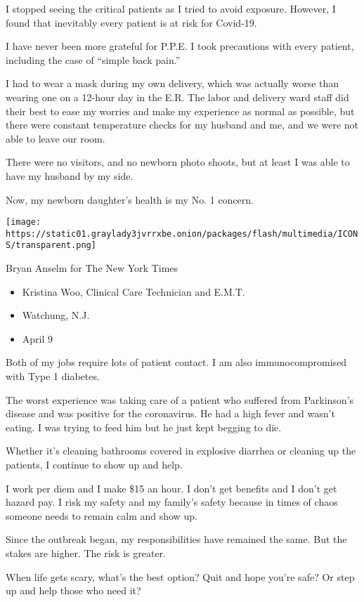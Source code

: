 I stopped seeing the critical patients as I tried to avoid exposure.
However, I found that inevitably every patient is at risk for Covid-19.

I have never been more grateful for P.P.E. I took precautions with every
patient, including the case of ``simple back pain.''

I had to wear a mask during my own delivery, which was actually worse
than wearing one on a 12-hour day in the E.R. The labor and delivery
ward staff did their best to ease my worries and make my experience as
normal as possible, but there were constant temperature checks for my
husband and me, and we were not able to leave our room.

There were no visitors, and no newborn photo shoots, but at least I was
able to have my husband by my side.

Now, my newborn daughter's health is my No. 1 concern.

\texttt{[image: https://static01.graylady3jvrrxbe.onion/packages/flash/multimedia/ICONS/transparent.png]}

Bryan Anselm for The New York Times

\begin{itemize}
\tightlist
\item
  Kristina Woo, Clinical Care Technician and E.M.T.
\item
  Watchung, N.J.
\item
  April 9
\end{itemize}

Both of my jobs require lots of patient contact. I am also
immunocompromised with Type 1 diabetes.

The worst experience was taking care of a patient who suffered from
Parkinson's disease and was positive for the coronavirus. He had a high
fever and wasn't eating. I was trying to feed him but he just kept
begging to die.

Whether it's cleaning bathrooms covered in explosive diarrhea or
cleaning up the patients, I continue to show up and help.

I work per diem and I make \$15 an hour. I don't get benefits and I
don't get hazard pay. I risk my safety and my family's safety because in
times of chaos someone needs to remain calm and show up.

Since the outbreak began, my responsibilities have remained the same.
But the stakes are higher. The risk is greater.

When life gets scary, what's the best option? Quit and hope you're safe?
Or step up and help those who need it?

